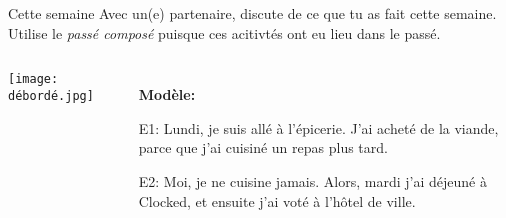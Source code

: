 \begin{frame}{Cette semaine}
  Avec un(e) partenaire, discute de ce que tu as fait cette semaine.
  Utilise le \emph{passé composé} puisque ces acitivtés ont eu lieu dans le passé.
  \begin{columns}
      \begin{center}
        \texttt{[image: débordé.jpg]}
      \end{center}
      \begin{itemize}
        \item[] \textbf{Modèle:}
        \item[E1:] Lundi, je suis allé à l'épicerie. J'ai acheté de la viande, parce que j'ai cuisiné un repas plus tard.
        \item[E2:] Moi, je ne cuisine jamais. Alors, mardi j'ai déjeuné à Clocked, et ensuite j'ai voté à l'hôtel de ville.
      \end{itemize}
  \end{columns}
\end{frame}